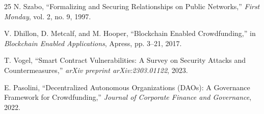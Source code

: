 \documentclass[conference]{IEEEtran}
\begin{document}
\begin{thebibliography}{25}
N. Szabo, ``Formalizing and Securing Relationships on Public Networks,'' \textit{First Monday}, vol. 2, no. 9, 1997.

V. Dhillon, D. Metcalf, and M. Hooper, ``Blockchain Enabled Crowdfunding,'' in \textit{Blockchain Enabled Applications}, Apress, pp. 3--21, 2017.

T. Vogel, ``Smart Contract Vulnerabilities: A Survey on Security Attacks and Countermeasures,'' \textit{arXiv preprint arXiv:2303.01122}, 2023.

E. Pasolini, ``Decentralized Autonomous Organizations (DAOs): A Governance Framework for Crowdfunding,'' \textit{Journal of Corporate Finance and Governance}, 2022.

\end{thebibliography}
\end{document}
